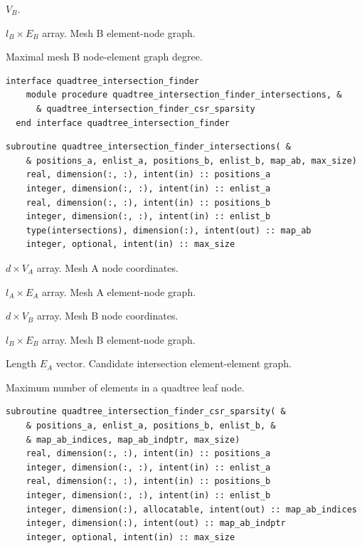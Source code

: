 \documentclass{article}
\begin{document}
\begin{description}[font=\ttfamily\bfseries,leftmargin=2.2\parindent,labelindent=1.7\parindent,noitemsep]
  \item[nnodes] $V_B$.
  \item[enlist] $l_B \times E_B$ array. Mesh B element-node graph.
  \item[max\_degree] Maximal mesh B node-element graph degree.
\end{description}

\begin{lstlisting}[language=FORTRAN]  
  interface quadtree_intersection_finder
    module procedure quadtree_intersection_finder_intersections, &
      & quadtree_intersection_finder_csr_sparsity
  end interface quadtree_intersection_finder
\end{lstlisting}

\begin{lstlisting}[language=FORTRAN]
  subroutine quadtree_intersection_finder_intersections( &
    & positions_a, enlist_a, positions_b, enlist_b, map_ab, max_size)
    real, dimension(:, :), intent(in) :: positions_a
    integer, dimension(:, :), intent(in) :: enlist_a
    real, dimension(:, :), intent(in) :: positions_b
    integer, dimension(:, :), intent(in) :: enlist_b
    type(intersections), dimension(:), intent(out) :: map_ab
    integer, optional, intent(in) :: max_size
\end{lstlisting}

\begin{description}[font=\ttfamily\bfseries,leftmargin=2.2\parindent,labelindent=1.7\parindent,noitemsep]
  \item[positions\_a] $d \times V_A$ array. Mesh A node coordinates.
  \item[enlist\_a] $l_A \times E_A$ array. Mesh A element-node graph.
  \item[positions\_b] $d \times V_B$ array. Mesh B node coordinates.
  \item[enlist\_b] $l_B \times E_B$ array. Mesh B element-node graph.
  \item[map\_ab] Length $E_A$ vector. Candidate intersection element-element
    graph.
  \item[max\_size] Maximum number of elements in a quadtree leaf node.
\end{description}
  
\begin{lstlisting}[language=FORTRAN]
  subroutine quadtree_intersection_finder_csr_sparsity( &
    & positions_a, enlist_a, positions_b, enlist_b, &
    & map_ab_indices, map_ab_indptr, max_size)
    real, dimension(:, :), intent(in) :: positions_a
    integer, dimension(:, :), intent(in) :: enlist_a
    real, dimension(:, :), intent(in) :: positions_b
    integer, dimension(:, :), intent(in) :: enlist_b
    integer, dimension(:), allocatable, intent(out) :: map_ab_indices
    integer, dimension(:), intent(out) :: map_ab_indptr
    integer, optional, intent(in) :: max_size
\end{lstlisting}
\end{document}
